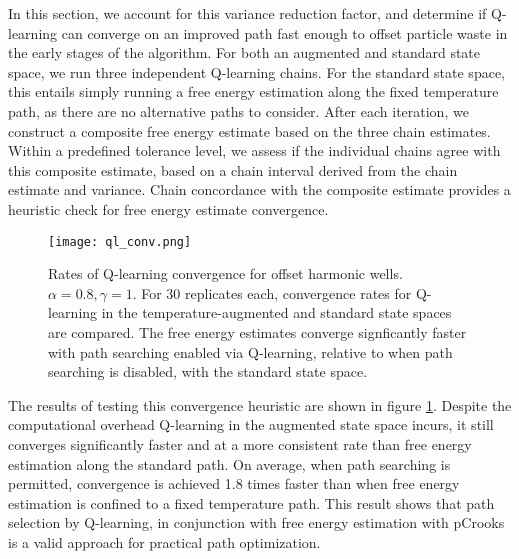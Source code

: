 In this section, we account for this variance reduction factor, and determine if Q-learning can converge on an improved path fast enough to offset particle waste in the early stages of the algorithm.
For both an augmented and standard state space, we run three independent Q-learning chains. 
For the standard state space, this entails simply running a free energy estimation along the fixed temperature path, as there are no alternative paths to consider.
After each iteration, we construct a composite free energy estimate based on the three chain estimates.
Within a predefined tolerance level, we assess if the individual chains agree with this composite estimate, based on a chain interval derived from the chain estimate and variance.
Chain concordance with the composite estimate provides a heuristic check for free energy estimate convergence.

\begin{figure}
    \centering
    \texttt{[image: ql\_conv.png]}
    \caption[Rates of Q-learning convergence]{Rates of Q-learning convergence for offset harmonic wells. $\alpha=0.8, \gamma=1$. For 30 replicates each, convergence rates for Q-learning in the temperature-augmented and standard state spaces are compared. The free energy estimates converge signficantly faster with path searching enabled via Q-learning, relative to when path searching is disabled, with the standard state space.}
    \label{fig:ql-convergence}
\end{figure}

The results of testing this convergence heuristic are shown in figure \ref{fig:ql-convergence}.
Despite the computational overhead Q-learning in the augmented state space incurs, it still converges significantly faster and at a more consistent rate than free energy estimation along the standard path.
On average, when path searching is permitted, convergence is achieved 1.8 times faster than when free energy estimation is confined to a fixed temperature path.
This result shows that path selection by Q-learning, in conjunction with free energy estimation with pCrooks is a valid approach for practical path optimization.

